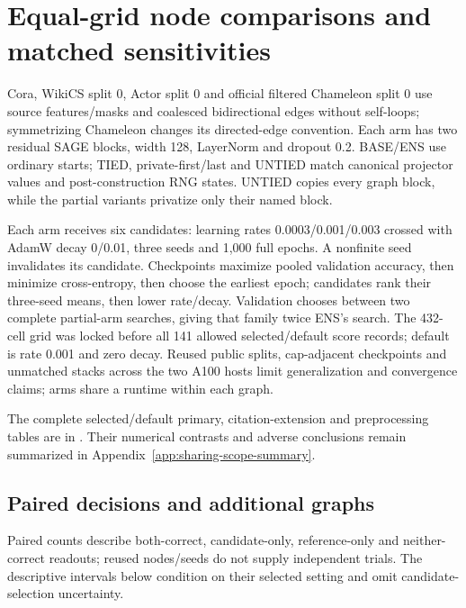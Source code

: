 \section{Equal-grid node comparisons and matched sensitivities}\label{app:validation-tuning}
Cora, WikiCS split 0, Actor split 0 and official filtered Chameleon split 0 use source features/masks and coalesced bidirectional edges without self-loops; symmetrizing Chameleon changes its directed-edge convention. Each arm has two residual SAGE blocks, width 128, LayerNorm and dropout 0.2. BASE/ENS use ordinary starts; TIED, private-first/last and UNTIED match canonical projector values and post-construction RNG states. UNTIED copies every graph block, while the partial variants privatize only their named block.

Each arm receives six candidates: learning rates 0.0003/0.001/0.003 crossed with AdamW decay 0/0.01, three seeds and 1,000 full epochs. A nonfinite seed invalidates its candidate. Checkpoints maximize pooled validation accuracy, then minimize cross-entropy, then choose the earliest epoch; candidates rank their three-seed means, then lower rate/decay. Validation chooses between two complete partial-arm searches, giving that family twice ENS's search. The 432-cell grid was locked before all 141 allowed selected/default score records; default is rate 0.001 and zero decay. Reused public splits, cap-adjacent checkpoints and unmatched stacks across the two A100 hosts limit generalization and convergence claims; arms share a runtime within each graph.

The complete selected/default primary, citation-extension and preprocessing tables are in . Their numerical contrasts and adverse conclusions remain summarized in Appendix~\ref{app:sharing-scope-summary}.

\subsection{Paired decisions and additional graphs}\label{app:paired-decisions}
Paired counts describe both-correct, candidate-only, reference-only and neither-correct readouts; reused nodes/seeds do not supply independent trials. The descriptive intervals below condition on their selected setting and omit candidate-selection uncertainty.

